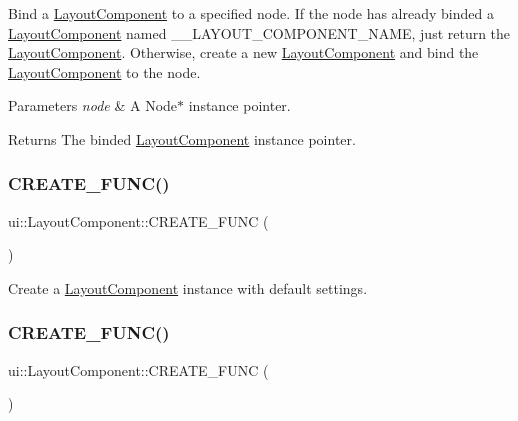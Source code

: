 Bind a \hyperlink{classui_1_1LayoutComponent}{Layout\+Component} to a specified node. If the node has already binded a \hyperlink{classui_1_1LayoutComponent}{Layout\+Component} named \+\_\+\+\_\+\+L\+A\+Y\+O\+U\+T\+\_\+\+C\+O\+M\+P\+O\+N\+E\+N\+T\+\_\+\+N\+A\+ME, just return the \hyperlink{classui_1_1LayoutComponent}{Layout\+Component}. Otherwise, create a new \hyperlink{classui_1_1LayoutComponent}{Layout\+Component} and bind the \hyperlink{classui_1_1LayoutComponent}{Layout\+Component} to the node. 
\begin{DoxyParams}{Parameters}
{\em node} & A Node$\ast$ instance pointer. \\
\hline
\end{DoxyParams}
\begin{DoxyReturn}{Returns}
The binded \hyperlink{classui_1_1LayoutComponent}{Layout\+Component} instance pointer. 
\end{DoxyReturn}
\mbox{\label{classui_1_1LayoutComponent_ae8c296aa496ccf281461adba27a9955f}} 
\subsubsection{\texorpdfstring{C\+R\+E\+A\+T\+E\+\_\+\+F\+U\+N\+C()}{CREATE\_FUNC()}\hspace{0.1cm}{\footnotesize\ttfamily [1/2]}}
{\footnotesize\ttfamily ui\+::\+Layout\+Component\+::\+C\+R\+E\+A\+T\+E\+\_\+\+F\+U\+NC (\begin{DoxyParamCaption}\item[{\hyperlink{classui_1_1LayoutComponent}{Layout\+Component}}]{ }\end{DoxyParamCaption})}

Create a \hyperlink{classui_1_1LayoutComponent}{Layout\+Component} instance with default settings. \mbox{\label{classui_1_1LayoutComponent_ae8c296aa496ccf281461adba27a9955f}} 
\subsubsection{\texorpdfstring{C\+R\+E\+A\+T\+E\+\_\+\+F\+U\+N\+C()}{CREATE\_FUNC()}\hspace{0.1cm}{\footnotesize\ttfamily [2/2]}}
{\footnotesize\ttfamily ui\+::\+Layout\+Component\+::\+C\+R\+E\+A\+T\+E\+\_\+\+F\+U\+NC (\begin{DoxyParamCaption}\item[{\hyperlink{classui_1_1LayoutComponent}{Layout\+Component}}]{ }\end{DoxyParamCaption})}


